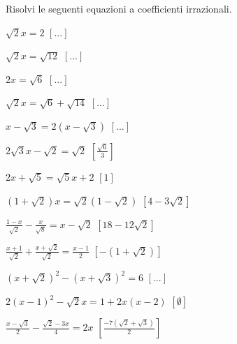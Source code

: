 \begin{esercizio}[\Ast]
 \label{ese:2.80}
Risolvi le seguenti equazioni a coefficienti irrazionali.
 \begin{multicols}{2}
 \begin{enumeratea}
 \item $\sqrt 2x=2$
  \hfill $\left[...\right]$
 \item $\sqrt 2x=\sqrt{12}$
  \hfill $\left[...\right]$
 \item $2x=\sqrt 6$
  \hfill $\left[...\right]$
 \item $\sqrt 2x=\sqrt 6+\sqrt{14}$
  \hfill $\left[...\right]$
 \item $x-\sqrt 3=2\left(x-\sqrt 3\right)$
  \hfill $\left[...\right]$
 \item $2\sqrt 3x-\sqrt 2=\sqrt 2$
  \hfill $\left[\frac{\sqrt 6} 3\right]$
 \item $2x+\sqrt 5=\sqrt 5x+2$
  \hfill $\left[1\right]$
 \item $(1+\sqrt 2)x=\sqrt 2(1-\sqrt 2)$
  \hfill $\left[4-3\sqrt 2\right]$
 \item $\frac{1-x}{\sqrt 2}-\frac x{\sqrt 8}=x-\sqrt 2$
  \hfill $\left[18-12\sqrt 2\right]$
 \item $\frac{x+1}{\sqrt 2}+\frac{x+\sqrt 2}{\sqrt 2}=\frac{x-1} 2$
  \hfill $\left[-(1+\sqrt 2)\right]$
 \item $(x+\sqrt 2)^2-(x+\sqrt 3)^2=6$
  \hfill $\left[...\right]$
 \item $2(x-1)^2-\sqrt 2x=1+2x(x-2)$
  \hfill $\left[\emptyset\right]$
 \item $\frac{x-\sqrt 3} 2-\frac{\sqrt 2-3x} 4=2x$
  \hfill $\left[\frac{-7(\sqrt 2+\sqrt 3)} 2\right]$
 \end{enumeratea}
 \end{multicols}
\end{esercizio}


